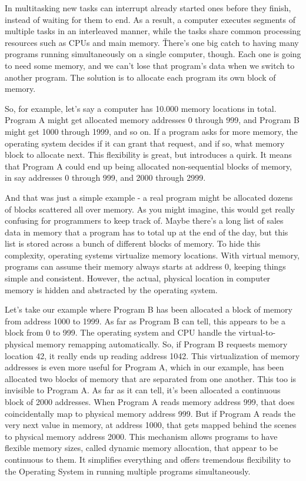 In multitasking new tasks can interrupt already started ones before they finish, instead of waiting for them to end.
As a result, a computer executes segments of multiple tasks in an interleaved manner, while the tasks share common
processing resources such as CPUs and main memory. \v

There's one big catch to having many programs running simultaneously on a single computer, though. Each one is going
to need some memory, and we can't lose that program's data when we switch to another program. The solution is to
allocate each program its own block of memory.

\be
So, for example, let's say a computer has 10.000 memory locations in total. Program A might get allocated memory
addresses 0 through 999, and Program B might get 1000 through 1999, and so on. If a program asks for more memory, the
operating system decides if it can grant that request, and if so, what memory block to allocate next. This
flexibility is great, but introduces a quirk. It means that Program A could end up being allocated non-sequential
blocks of memory, in say addresses 0 through 999, and 2000 through 2999.
\ee

And that was just a simple example - a real program might be allocated dozens of blocks scattered all over memory. As
you might imagine, this would get really confusing for programmers to keep track of. Maybe there's a long list of
sales data in memory that a program has to total up at the end of the day, but this list is stored across a bunch of
different blocks of memory. To hide this complexity, operating systems virtualize memory locations. With virtual
memory, programs can assume their memory always starts at address 0, keeping things simple and consistent. However,
the actual, physical location in computer memory is hidden and abstracted by the operating system.

\be
Let's take our example where Program B has been allocated a block of memory from address 1000 to 1999. As far as
Program B can tell, this appears to be a block from 0 to 999. The operating system and CPU handle the
virtual-to-physical memory remapping automatically. So, if Program B requests memory location 42, it really ends up
reading address 1042. This virtualization of memory addresses is even more useful for Program A, which in our example,
has been allocated two blocks of memory that are separated from one another. This too is invisible to Program A. As far
as it can tell, it's been allocated a continuous block of 2000 addresses. When Program A reads memory address 999,
that does coincidentally map to physical memory address 999. But if Program A reads the very next value in memory, at
address 1000, that gets mapped behind the scenes to physical memory address 2000. This mechanism allows programs to
have flexible memory sizes, called dynamic memory allocation, that appear to be continuous to them. It simplifies
everything and offers tremendous flexibility to the Operating System in running multiple programs simultaneously.
\ee

